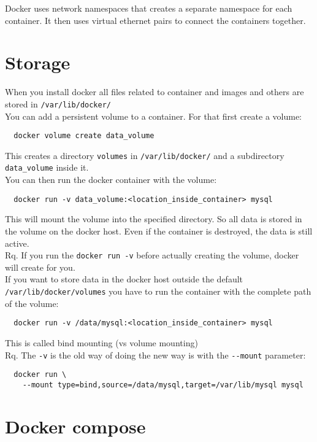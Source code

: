 \documentclass[french]{article}
\begin{document}
Docker uses network namespaces that creates a separate namespace for each container. It then uses virtual ethernet pairs to connect the containers together.

\section{Storage}

When you install docker all files related to container and images and others are stored in \verb|/var/lib/docker/|\\

You can add a persistent volume to a container. For that first create a volume:
\begin{verbatim}
  docker volume create data_volume
\end{verbatim}
This creates a directory \verb|volumes| in \verb|/var/lib/docker/| and a subdirectory \verb|data_volume| inside it.\\

You can then run the docker container with the volume:
\begin{verbatim}
  docker run -v data_volume:<location_inside_container> mysql
\end{verbatim}
This will mount the volume into the specified directory. So all data is stored in the volume on the docker host. Even if the container is destroyed, the data is still active.\\

Rq. If you run the \verb|docker run -v| before actually creating the volume, docker will create for you.\\

If you want to store data in the docker host outside the default \verb|/var/lib/docker/volumes| you have to run the container with the complete path of the volume:
\begin{verbatim}
  docker run -v /data/mysql:<location_inside_container> mysql
\end{verbatim}
This is called bind mounting (vs volume mounting)\\

Rq. The \verb|-v| is the old way of doing the new way is with the \verb|--mount| parameter:
\begin{verbatim}
  docker run \
    --mount type=bind,source=/data/mysql,target=/var/lib/mysql mysql
\end{verbatim}

\section{Docker compose}
\end{document}
